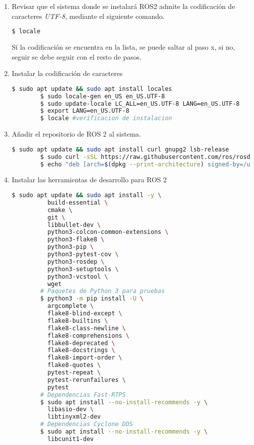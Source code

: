 \begin{enumerate}
    \item Revisar que el sistema donde se instalará ROS2 admite la codificación de caracteres \textit{UTF-8}, mediante el siguiente comando.

    \begin{lstlisting}[language = bash]
        $ locale
    \end{lstlisting}

    Sí la codificación se encuentra en la lista, se puede saltar al paso x, si no, seguir se debe seguir con el resto de pasos.

    \item Instalar la codificación de caracteres

    \begin{lstlisting}[language = bash]
        $ sudo apt update && sudo apt install locales
        $ sudo locale-gen en_US en_US.UTF-8
        $ sudo update-locale LC_ALL=en_US.UTF-8 LANG=en_US.UTF-8
        $ export LANG=en_US.UTF-8
        $ locale #verificacion de instalacion
    \end{lstlisting}

    \item Añadir el repositorio de ROS 2 al sistema. 
    
    \begin{lstlisting}[language = bash]
        $ sudo apt update && sudo apt install curl gnupg2 lsb-release
        $ sudo curl -sSL https://raw.githubusercontent.com/ros/rosdistro/master/ros.key  -o /usr/share/keyrings/ros-archive-keyring.gpg
        $ echo "deb [arch=$(dpkg --print-architecture) signed-by=/usr/share/keyrings/ros-archive-keyring.gpg] http://packages.ros.org/ros2/ubuntu $(lsb_release -cs) main" | sudo tee /etc/apt/sources.list.d/ros2.list > /dev/null
    \end{lstlisting}

    \item Instalar las herramientas de desarrollo para ROS 2

    \begin{lstlisting}[language = bash]
        $ sudo apt update && sudo apt install -y \
          build-essential \
          cmake \
          git \
          libbullet-dev \
          python3-colcon-common-extensions \
          python3-flake8 \
          python3-pip \
          python3-pytest-cov \
          python3-rosdep \
          python3-setuptools \
          python3-vcstool \
          wget
        # Paquetes de Python 3 para pruebas
        $ python3 -m pip install -U \
          argcomplete \
          flake8-blind-except \
          flake8-builtins \
          flake8-class-newline \
          flake8-comprehensions \
          flake8-deprecated \
          flake8-docstrings \
          flake8-import-order \
          flake8-quotes \
          pytest-repeat \
          pytest-rerunfailures \
          pytest
        # Dependencias Fast-RTPS
        $ sudo apt install --no-install-recommends -y \
          libasio-dev \
          libtinyxml2-dev
        # Dependencias Cyclone DDS
        $ sudo apt install --no-install-recommends -y \
          libcunit1-dev
    \end{lstlisting}


\end{enumerate}
